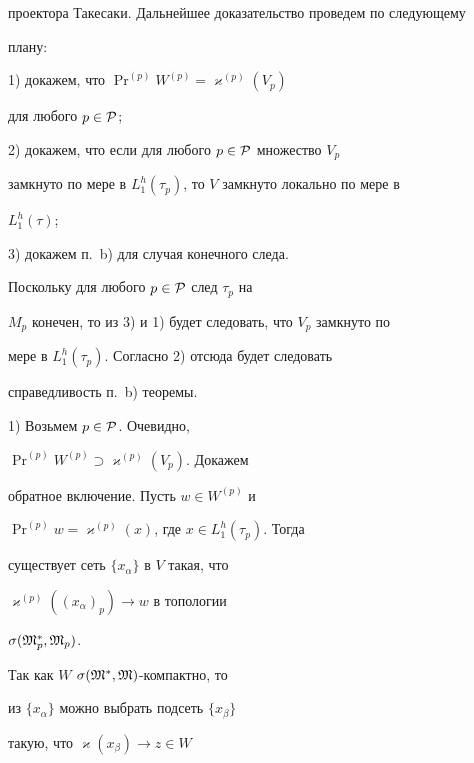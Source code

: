 \begin{pf}
проектора Такесаки. Дальнейшее доказательство проведем по следующему 


плану:


\smallskip





1) докажем, что $\Pr^{(p)} W^{(p)}=\varkappa^{(p)} (V_p)$ 


для любого $p \in {\cal P}$;





2) докажем, что если для любого $p \in {\cal P}$ множество $V_p$ 


замкнуто по мере в $L_1^h (\tau_p)$, то $V$ замкнуто локально по мере в 


$L_1^h (\tau)$;





3) докажем п.~b) для случая конечного следа.


\smallskip





\noindent Поскольку для любого $p \in {\cal P}$ след $\tau_p$ на 


$M_p$ конечен, то из 3) и 1) будет следовать, что $V_p$ замкнуто по 


мере в $L_1^h (\tau_p)$. Согласно 2) отсюда будет следовать 


справедливость п.~b) теоремы.


\smallskip





1) Возьмем $p \in {\cal P}$. Очевидно, 


$\Pr^{(p)} W^{(p)} \supset \varkappa^{(p)} (V_p)$. Докажем 


обратное включение. Пусть $w \in W^{(p)}$ и 


$\Pr^{(p)} w=\varkappa^{(p)} (x)$, где $x \in L_1^h (\tau_p)$. Тогда 


существует сеть $\{x_{\alpha}\}$ в $V$ такая, что 


$\varkappa^{(p)} ((x_{\alpha})_p) \to w$ в топологии 


$\sigma ({\frak M}_p^*, {\frak M}_p)$. 


Так как $W$\; $\sigma ({\frak M}^*, {\frak M})$-компактно, то


из $\{x_{\alpha}\}$ можно выбрать подсеть $\{x_{\beta}\}$ 


такую, что $\varkappa (x_{\beta}) \to z \in W$ 



\end{pf}
